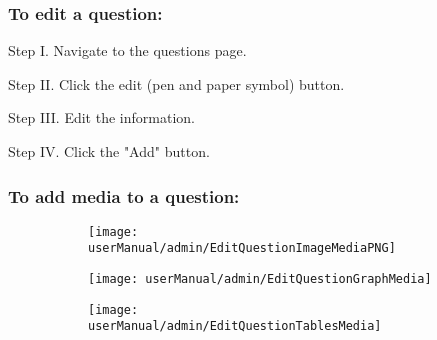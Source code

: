 \subsubsection{To edit a question:}
\begin{userManualItemlist}
    \item[Step I.] Navigate to the questions page.
    \item[Step II.] Click the edit (pen and paper symbol) button.
    \item[Step III.] Edit the information.
    \item[Step IV.] Click the "Add" button.  
\end{userManualItemlist}

\subsubsection{To add media to a question:}

\begin{figure}[H]
	\begin{subfigure}{0.70\linewidth}
		\texttt{[image: userManual/admin/EditQuestionImageMediaPNG]}
		\caption{}
		\label{fig:EditQuestionImageMedia}
	\end{subfigure}
	\begin{subfigure}{0.70\linewidth}
		\texttt{[image: userManual/admin/EditQuestionGraphMedia]}
		\caption{}
		\label{fig:EditQuestionGraphMedia}
    \end{subfigure}
	\begin{subfigure}{0.70\linewidth}
		\texttt{[image: userManual/admin/EditQuestionTablesMedia]}
		\caption{}
		\label{fig:EditQuestionTableMedia}
	\end{subfigure}
\end{figure}

